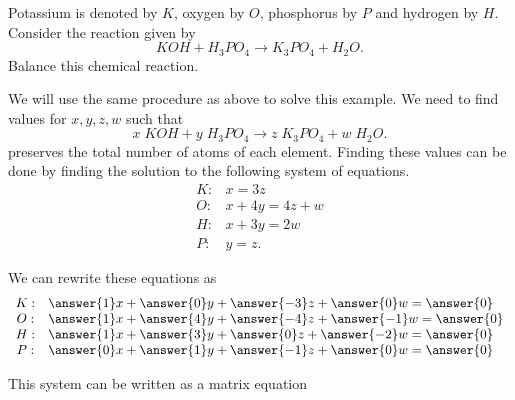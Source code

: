 \documentclass{ximera}
\begin{document}
\begin{example}
  Potassium is denoted by $K$, oxygen by $O$, phosphorus by $P$ and
  hydrogen by $H$.  Consider the reaction given by
  \begin{equation*}
    KOH+H_3PO_4\rightarrow K_3PO_4+H_2O.
  \end{equation*}
  Balance this chemical reaction.


\begin{solution}
  We will use the same procedure as above to solve this example. We
  need to find values for $x,y,z,w$ such that
  \begin{equation*}
    x\;KOH+y\;H_3PO_4\rightarrow z\;K_3PO_4+w\;H_2O.
  \end{equation*}
  preserves the total number of atoms of each element.  Finding these
  values can be done by finding the solution to the following system
  of equations.
  \begin{equation*}
    \begin{array}{cl}
      K: & x=3z \\
      O: & x+4y=4z+w \\
      H: & x+3y=2w \\
      P: & y=z.
    \end{array}
  \end{equation*}
 
  We can rewrite these equations as
  \begin{equation*}
    \begin{array}{cl}
      K: & \answer{1}x + \answer{0}y + \answer{-3}z + \answer{0}w = \answer{0} \\
      O: & \answer{1}x + \answer{4}y + \answer{-4}z + \answer{-1}w = \answer{0} \\
      H: & \answer{1}x + \answer{3}y + \answer{0}z + \answer{-2}w = \answer{0} \\
      P: & \answer{0}x + \answer{1}y + \answer{-1}z + \answer{0}w = \answer{0}
    \end{array}
  \end{equation*}

  This system can be written as a matrix equation


\end{solution}
\end{example}
\end{document}
